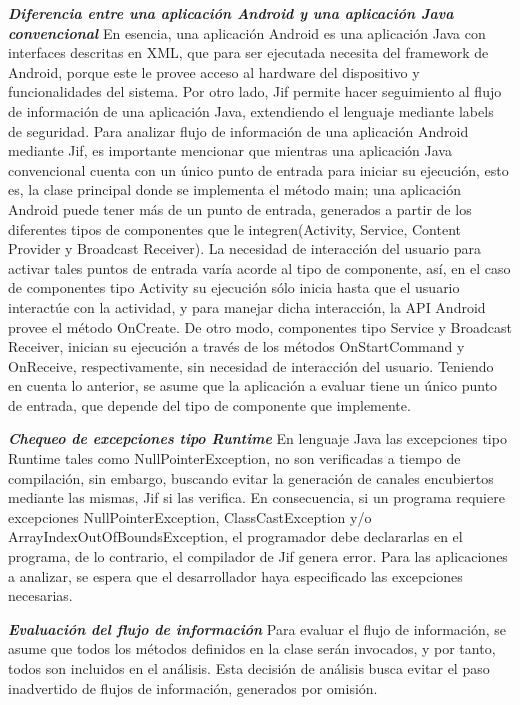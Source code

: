 \textit{\textbf{Diferencia entre una aplicación Android y una aplicación Java
convencional}}\newline 
En esencia, una aplicación Android es una aplicación Java con interfaces
descritas en XML, que para ser ejecutada necesita del framework de Android,
porque este le provee acceso al hardware del dispositivo y funcionalidades del
sistema.\newline 
Por otro lado, Jif permite hacer seguimiento al flujo de información de una
aplicación Java, extendiendo el lenguaje mediante labels de seguridad.\newline
Para analizar flujo de información de una aplicación Android mediante
Jif, es importante mencionar que mientras una aplicación Java convencional
cuenta con un único punto de entrada para iniciar su ejecución, esto es, la
clase principal donde se implementa el método main; una aplicación Android puede
tener más de un punto de entrada, generados a partir de los diferentes tipos de
componentes que le integren(Activity, Service, Content Provider y Broadcast
Receiver). La necesidad de interacción del usuario para activar tales puntos de
entrada varía acorde al tipo de componente, así, en el caso de componentes tipo
Activity su ejecución sólo inicia hasta que el usuario interactúe con la
actividad, y para manejar dicha interacción, la API Android provee el método
OnCreate. De otro modo, componentes tipo Service y Broadcast Receiver, inician
su ejecución a través de los métodos OnStartCommand y OnReceive,
respectivamente, sin necesidad de interacción del usuario.\newline 
{ \color{black} {Teniendo en cuenta lo anterior, se asume que la aplicación a
evaluar tiene un único punto de entrada, que depende del tipo de componente que
implemente.} }

\textit{\textbf{Chequeo de excepciones tipo Runtime}}\newline
En lenguaje Java las excepciones tipo Runtime tales como NullPointerException, no
son verificadas a tiempo de compilación, sin embargo, buscando evitar la
generación de canales encubiertos mediante las mismas, Jif si las verifica. 
En consecuencia, si un programa requiere excepciones NullPointerException,
ClassCastException y/o ArrayIndexOutOfBoundsException, el programador debe
declararlas en el programa, de lo contrario, el compilador de Jif genera error.
Para las aplicaciones a analizar, se espera que el desarrollador haya
especificado las excepciones necesarias.

\textit{\textbf{Evaluación del flujo de información}}\newline
Para evaluar el flujo de información, se asume que todos los métodos definidos 
en la clase serán invocados, y por tanto, todos son incluidos en el análisis.\newline 
Esta decisión de análisis busca evitar el paso inadvertido de flujos de
información, generados por omisión.

